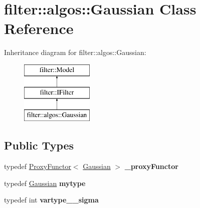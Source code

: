 \hypertarget{classfilter_1_1algos_1_1_gaussian}{}\section{filter\+:\+:algos\+:\+:Gaussian Class Reference}
\label{classfilter_1_1algos_1_1_gaussian}
Inheritance diagram for filter\+:\+:algos\+:\+:Gaussian\+:\begin{figure}[H]
\begin{center}
\leavevmode
\includegraphics[height=3.000000cm]{db/d1c/classfilter_1_1algos_1_1_gaussian}
\end{center}
\end{figure}
\subsection*{Public Types}
\begin{DoxyCompactItemize}
\item 
\mbox{\label{classfilter_1_1algos_1_1_gaussian_a2134cf203279385b1d54164997248342}} 
typedef \hyperlink{class_proxy_functor}{Proxy\+Functor}$<$ \hyperlink{classfilter_1_1algos_1_1_gaussian}{Gaussian} $>$ {\bfseries \+\_\+proxy\+Functor}
\item 
\mbox{\label{classfilter_1_1algos_1_1_gaussian_ab9dd3d4c5f8e0c9e4955deacc2ce1108}} 
typedef \hyperlink{classfilter_1_1algos_1_1_gaussian}{Gaussian} {\bfseries mytype}
\item 
\mbox{\label{classfilter_1_1algos_1_1_gaussian_abfc9628637474ad4930c1a9a94f332c8}} 
typedef int {\bfseries vartype\+\_\+\+\_\+sigma}
\end{DoxyCompactItemize}
